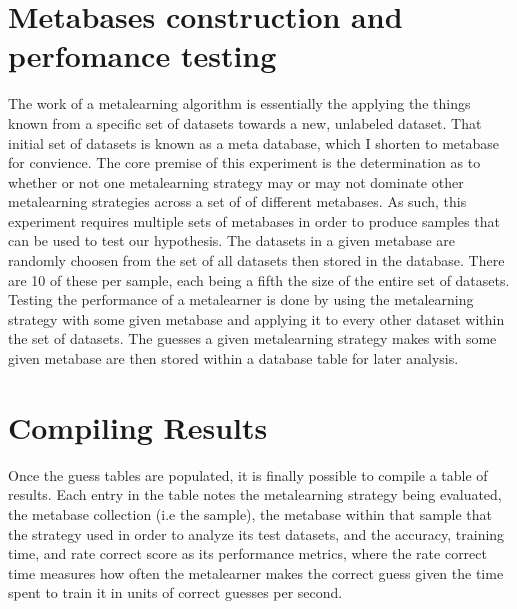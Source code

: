 \section{Metabases construction and perfomance testing}
The work of a metalearning algorithm is essentially the applying the things
known from a specific set of datasets towards a new, unlabeled dataset. That
initial set of datasets is known as a meta database, which I shorten to metabase
for convience. The core premise of this experiment is the determination as to
whether or not one metalearning strategy may or may not dominate other
metalearning strategies across a set of of different metabases. As such, this
experiment requires multiple sets of metabases in order to produce samples
that can be used to test our hypothesis. The datasets in a given metabase are
randomly choosen from the set of all datasets then stored in the database. There
are 10 of these per sample, each being a fifth the size of the entire set of
datasets. Testing the performance of a metalearner is done by using the
metalearning strategy with some given metabase and applying it to every other
dataset within the set of datasets. The guesses a given metalearning strategy
makes with some given metabase are then stored within a database table for later
analysis.

\section{Compiling Results}
Once the guess tables are populated, it is finally possible to compile a table
of results. Each entry in the table notes the metalearning strategy being
evaluated, the metabase collection (i.e the sample), the metabase within that
sample that the strategy used in order to analyze its test datasets, and the
accuracy, training time, and rate correct score as its performance metrics,
where the rate correct time measures how often the metalearner makes the correct
guess given the time spent to train it in units of correct guesses per second.
